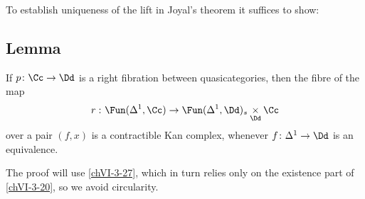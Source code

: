        To establish uniqueness of the lift in Joyal's theorem it suffices to show:

    \subsection{Lemma}\label{chVI-3-46}
        If $p \colon \Cc \to \Dd$ is a right fibration between quasicategories, then the fibre of the map
        \begin{equation*}
            r \,\colon \Fun(\Delta^1, \Cc) \to \Fun(\Delta^1, \Dd)_s \underset{\Dd}{\times} \Cc
        \end{equation*}
        over a pair $(f, x)$ is a contractible Kan complex, whenever $f \colon \Delta^1 \to \Dd$ is an equivalence.
        \medskip

        The proof will use \ref{chVI-3-27}, which in turn relies only on the existence part of \ref{chVI-3-20}, so we avoid circularity.
        \smallskip

